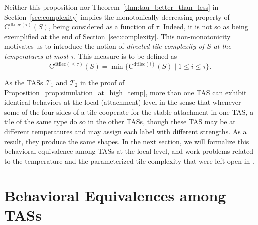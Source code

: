 \documentclass{article}
\theoremstyle{remark}
\theoremstyle{definition}
\newcommand{\tas}{\ensuremath{\mathcal{T}}}
\newcommand{\dtilec}[1]{\ensuremath{\mathrm{C}^{\mathrm{dtilec}(#1)}}}
\begin{document}
Neither this proposition nor Theorem~\ref{thm:tau_better_than_less} in Section~\ref{sec:complexity} implies the monotonically decreasing property of $\dtilec{\tau}(S)$, being considered as a function of $\tau$. 
Indeed, it is not so as being exemplified at the end of Section~\ref{sec:complexity}. 
This non-monotonicity motivates us to introduce the notion of {\it directed tile complexity of $S$ at the temperatures at most $\tau$}. 
This measure is to be defined as 
\[
	\dtilec{\le \tau}(S) = \min\{\dtilec{i}(S) \mid 1 \le i \le \tau\}.
\]

As the TASs $\tas_1$ and $\tas_2$ in the proof of Proposition~\ref{prop:simulation_at_high_temp}, more than one TAS can exhibit identical behaviors at the local (attachment) level in the sense that whenever some of the four sides of a tile cooperate for the stable attachment in one TAS, a tile of the same type do so in the other TASs, though these TAS may be at different temperatures and may assign each label with different strengths. 
As a result, they produce the same shapes. 
In the next section, we will formalize this behavioral equivalence among TASs at the local level, and work problems related to the temperature and the parameterized tile complexity that were left open in \cite{AdChGoHuKeEsRo2002, ChenDotySeki2011}. 

	\section{Behavioral Equivalences among TASs}
	\label{sec:behavior}
\end{document}
